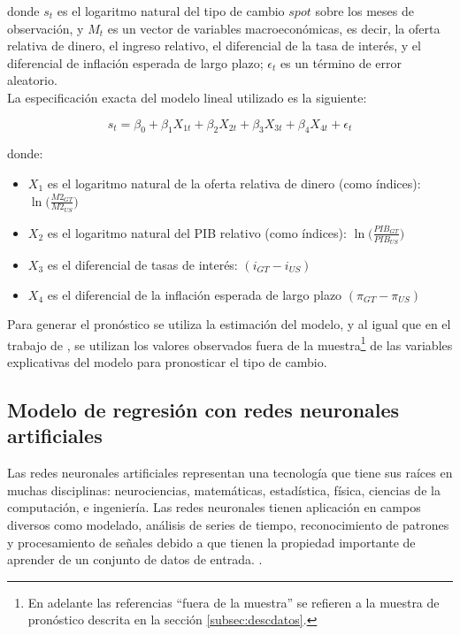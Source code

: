 donde $s_t$ es el logaritmo natural del tipo de cambio $spot$ sobre los meses de observación, y $M_t$ es un vector de variables macroeconómicas, es decir, la oferta relativa de dinero, el ingreso relativo, el diferencial de la tasa de interés, y el diferencial de inflación esperada de largo plazo; $\epsilon_t$ es un término de error aleatorio.\\

La especificación exacta del modelo lineal utilizado es la siguiente:

\begin{equation}
s_t = \beta_0 + \beta_1 X_{1t} + \beta_2 X_{2t} + \beta_3 X_{3t} + \beta_4 X_{4t} + \epsilon_t
\label{linearModel}
\end{equation}

donde:

\begin{itemize}
	\item $X_1$ es el logaritmo natural de la oferta relativa de dinero (como índices): $ \ln \big ( \frac{M2_{GT}}{M2_{US}} \big) $
	
	\item $X_2$ es el logaritmo natural del PIB relativo (como índices): $ \ln \big ( \frac{PIB_{GT}}{PIB_{US}} \big) $
	
	\item $X_3$ es el diferencial de tasas de interés: $ ( i_{GT} - i_{US} ) $
	
	\item $X_4$ es el diferencial de la inflación esperada de largo plazo $ ( \pi_{GT} - \pi_{US} ) $
	
\end{itemize}

Para generar el pronóstico se utiliza la estimación del modelo, y al igual que en el trabajo de \textcite{meese1983empirical}, se utilizan los valores observados fuera de la muestra\footnote{En adelante las referencias ``fuera de la muestra'' se refieren a la muestra de pronóstico descrita en la sección \ref{subsec:descdatos}.} de las variables explicativas del modelo para pronosticar el tipo de cambio.


\newpage
\subsection{Modelo de regresión con redes neuronales artificiales}

Las redes neuronales artificiales representan una tecnología que tiene sus raíces en muchas disciplinas: neurociencias, matemáticas, estadística, física, ciencias de la computación, e ingeniería. Las redes neuronales tienen aplicación en campos diversos como modelado, análisis de series de tiempo, reconocimiento de patrones y procesamiento de señales debido a que tienen la propiedad importante de aprender de un conjunto de datos de entrada. \parencite{haykin1999neural}.\\

